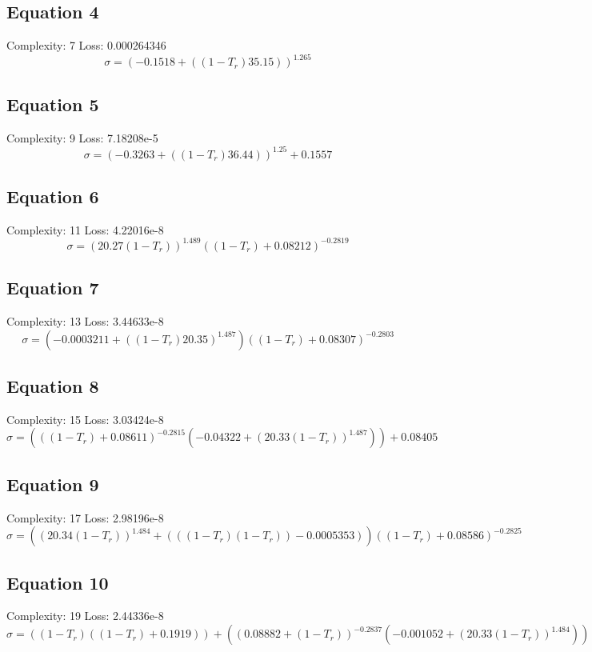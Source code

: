\documentclass[11pt]{article}
\begin{document}
\subsection*{Equation 4}
\noindent Complexity: 7 \quad Loss: 0.000264346 \\[4pt]
\[
\sigma = \left(-0.1518 + ((1 - T_r) 35.15)\right)^{1.265}
\]

\subsection*{Equation 5}
\noindent Complexity: 9 \quad Loss: 7.18208e-5 \\[4pt]
\[
\sigma = \left(-0.3263 + ((1 - T_r) 36.44)\right)^{1.25} + 0.1557
\]

\subsection*{Equation 6}
\noindent Complexity: 11 \quad Loss: 4.22016e-8 \\[4pt]
\[
\sigma = \left(20.27 (1 - T_r)\right)^{1.489} \left((1 - T_r) + 0.08212\right)^{-0.2819}
\]

\subsection*{Equation 7}
\noindent Complexity: 13 \quad Loss: 3.44633e-8 \\[4pt]
\[
\sigma = (-0.0003211 + \left((1 - T_r) 20.35\right)^{1.487}) \left((1 - T_r) + 0.08307\right)^{-0.2803}
\]

\subsection*{Equation 8}
\noindent Complexity: 15 \quad Loss: 3.03424e-8 \\[4pt]
\[
\sigma = (\left((1 - T_r) + 0.08611\right)^{-0.2815} (-0.04322 + \left(20.33 (1 - T_r)\right)^{1.487})) + 0.08405
\]

\subsection*{Equation 9}
\noindent Complexity: 17 \quad Loss: 2.98196e-8 \\[4pt]
\[
\sigma = (\left(20.34 (1 - T_r)\right)^{1.484} + (((1 - T_r) (1 - T_r)) - 0.0005353)) \left((1 - T_r) + 0.08586\right)^{-0.2825}
\]

\subsection*{Equation 10}
\noindent Complexity: 19 \quad Loss: 2.44336e-8 \\[4pt]
\[
\sigma = ((1 - T_r) ((1 - T_r) + 0.1919)) + (\left(0.08882 + (1 - T_r)\right)^{-0.2837} (-0.001052 + \left(20.33 (1 - T_r)\right)^{1.484}))
\]
\end{document}
